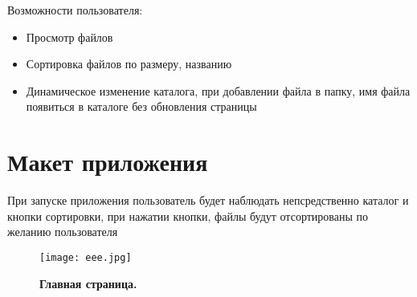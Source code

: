 \documentclass[a4paper,14pt]{extarticle} %
\begin{document}
\item{Возможности пользователя:}
\begin{itemize}
\item{Просмотр файлов}
\item{Сортировка файлов по размеру, названию}
\item{Динамическое изменение каталога, при добавлении файла в папку, имя файла появиться в каталоге без обновления страницы}

\end{itemize}


\section*{Макет приложения}

При запуске приложения пользователь будет наблюдать непсредственно каталог и кнопки сортировки, при нажатии кнопки, файлы будут отсортированы по желанию пользователя

\begin{figure}[h]
\centering
\texttt{[image: eee.jpg]}
\caption{\bf Главная страница.}
\end{figure}


\newpage
\end{document}
